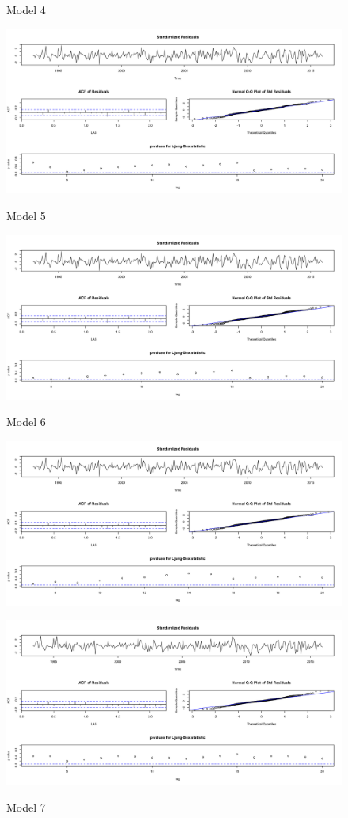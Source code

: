 \documentclass[twoside,twocolumn]{article}
\begin{document}
      
      
         \begin{figure}[H]
    	\centering
     	\caption{Model 4}
     	\includegraphics[width=\linewidth]{images/sarima4}
     	\label{fig:sarima4}
     	\caption{Model 5}
     	\includegraphics[width=\linewidth]{images/sarima5}
     	\label{fig:sarima5}
     	\caption{Model 6}
     	\includegraphics[width=\linewidth]{images/sarima6}
     	\label{fig:sarima6}
     	     	\caption{Model 7}
     	\includegraphics[width=\linewidth]{images/sarima7}
     	\label{fig:sarima7}
      \end{figure}
\end{document}
